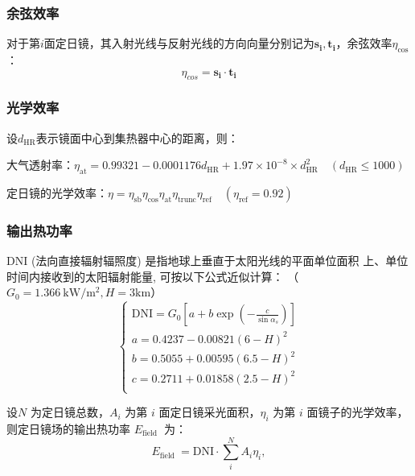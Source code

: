 \documentclass{article}
\numberwithin{equation}{subsection}
\begin{document}
\subsubsection{余弦效率}
对于第$i$面定日镜，其入射光线与反射光线的方向向量分别记为$\bm{s_i},\bm{t_i}$，余弦效率$\eta_{\cos}$\cite{1}：
\begin{equation}
    \eta_{cos}=\bm{s_i}\cdot\bm{t_i}
\end{equation}

\subsubsection{光学效率}

设$d_{\mathrm{HR}}$表示镜面中心到集热器中心的距离，则：

大气透射率：$\eta_{\mathrm{at}}=0.99321-0.0001176 d_{\mathrm{HR}}+1.97 \times 10^{-8} \times d_{\mathrm{HR}}^2 \quad\left(d_{\mathrm{HR}} \leq 1000\right) $

定日镜的光学效率：$\eta=\eta_{\mathrm{sb}} \eta_{\mathrm{cos}} \eta_{\mathrm{at}} \eta_{\text {trunc}} \eta_{\mathrm{ref}}\quad\left(\eta_{\mathrm{ref}}=0.92\right) $

\subsubsection{输出热功率}
DNI (法向直接辐射辐照度) 是指地球上垂直于太阳光线的平面单位面积 上、单位时间内接收到的太阳辐射能量, 可按以下公式近似计算：
（$G_0=1.366 \mathrm{~kW} / \mathrm{m}^2, H=3\mathrm{km}$）
\begin{equation}
    \left\{\begin{array}{l}
        \text {DNI}=G_0\left[a+b \exp \left(-\frac{c}{\sin \alpha_s}\right)\right] \\
        a=0.4237-0.00821(6-H)^2\\
        b=0.5055+0.00595(6.5-H)^2 \\
        c=0.2711+0.01858(2.5-H)^2\\
    \end{array}\right.
\end{equation}

\noindent
设$N$ 为定日镜总数，$A_i$ 为第 $i$ 面定日镜采光面积，$\eta_i$ 为第 $i$ 面镜子的光学效率，则定日镜场的输出热功率 $E_{\text {field }}$ 为：
\begin{equation}
    E_{\text {field }}=\mathrm{DNI} \cdot \sum_i^N A_i \eta_i,
\end{equation}
\end{document}
